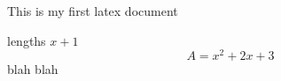 \documentclass[12pt]{article}
\begin{document}
This is my first latex document

lengths $ x+1 $ $$A=x^2+2x+3$$ blah blah
\end{document}
